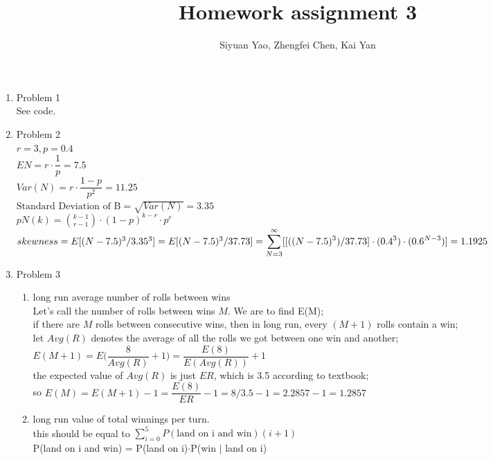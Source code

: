 \documentclass{amsart}
\begin{document}
\title{Homework assignment 3}
\author{Siyuan Yao, Zhengfei Chen, Kai Yan}
\maketitle

\thispagestyle{empty}
\pagestyle{empty}

\begin{enumerate}
\item Problem 1\\
See code.
\item Problem 2\\
$r = 3, p = 0.4$\\
$EN = r\cdot \dfrac{1}{p}=7.5$\\
$Var(N) = r\cdot \dfrac{1-p}{p^2}=11.25$\\
$\text{Standard Deviation of B} = \sqrt{Var(N)}= 3.35$\\
$pN(k) = \displaystyle\binom{k-1}{r-1}\cdot(1-p)^{k-r}\cdot p^r$\\
$skewness = E[(N-7.5)^3 / 3.35^3] = E[(N-7.5)^3/37.73] \\= \displaystyle\sum^\infty_{N=3}[ [((N-7.5)^3) / 37.73] \cdot(0.4^3) \cdot (0.6 ^ {N-3} ) ]= 1.1925$
\item Problem 3\\
\begin{enumerate}
\item long run average number of rolls between wins\\
 Let's call the number of rolls between wins $M$. We are to find E(M);\\
  if there are $M$ rolls between consecutive wins, then in long run, every $(M+1)$ rolls contain a win;\\
  let $Avg(R)$ denotes the average of all the rolls we got between one win and another;\\
  $E(M+1) = E\bigg(\dfrac{8}{Avg(R)}+1\bigg)=\dfrac{E(8)}{ E(Avg(R))} +1$\\
  the expected value of $Avg(R)$ is just $ER$, which is 3.5 according to textbook;\\
so $E(M) = E(M+1) -1 = \dfrac{E(8)}{ER} -1 = 8/3.5 -1 = 2.2857 -1 = 1.2857$
\item long run value of total winnings per turn. \\
  this should be equal to $\displaystyle\sum^5_{i=0}P(\text{land on i and win})(i+1)$\\
  P(land on i and win) = P(land on i)$\cdot$P(win $|$ land on i)\\

\end{enumerate}
\end{enumerate}
\end{document}
